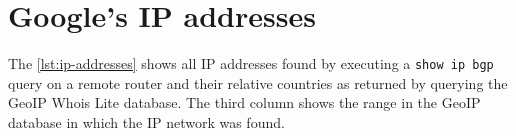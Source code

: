 \documentclass[10pt,a4paper,twoside,onecolumn]{article}
\begin{document}



\cleardoublepage
\section{Google's IP addresses}
\label{apx:ip-addresses}

The \autoref{lst:ip-addresses} shows all IP addresses found by executing a \texttt{show ip bgp} query on a remote router and their relative countries as returned by querying the GeoIP Whois Lite database. The third column shows the range in the GeoIP database in which the IP network was found.

\vspace*{5mm}
\end{document}
